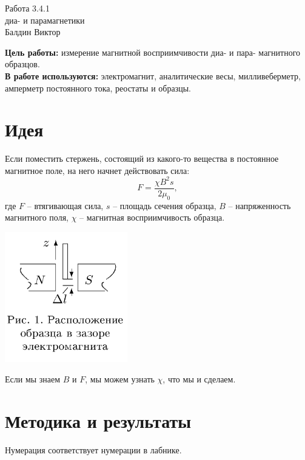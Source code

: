 \documentclass[a4paper,12pt]{article}
\begin{document}
\begin{center}
  \LARGE{Работа 3.4.1}\\[0.2cm]
  \LARGE{диа- и парамагнетики}\\[0.2cm]
  \large{Балдин Виктор}\\[0.2cm]
\end{center}

\textbf{Цель работы:} измерение магнитной восприимчивости диа- и пара- магнитного образцов.\\
\textbf{В работе используются:} электромагнит, аналитические весы, милливеберметр, амперметр постоянного тока, реостаты и образцы.\\
\section*{Идея}

Если поместить стержень, состоящий из какого-то вещества в постоянное магнитное поле, на него начнет действовать сила:
$$F = \frac{\chi B^2 s}{2\mu_0},$$
где $F$ -- втягивающая сила, $s$ -- площадь сечения образца, $B$ -- напряженность магнитного поля, $\chi$ -- магнитная восприимчивость образца.

\begin{center}
\includegraphics[width=0.40\textwidth]{1.png}
\end{center}

Если мы знаем $B$ и $F$, мы можем узнать $\chi$, что мы и сделаем.

\newpage
\section*{Методика и результаты}
Нумерация соответствует нумерации в лабнике.
\end{document}
